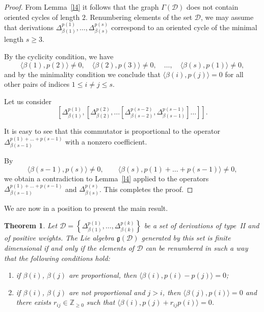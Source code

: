 \documentclass[a4paper, 12pt,oneside,reqno]{amsart}
\numberwithin{equation}{section}
\newtheorem{theorem}{Theorem}[section]
\theoremstyle{definition}
\begin{document}
\begin{proof}
From Lemma~\ref{l4} it follows that the graph $\Gamma(\mathcal{D})$ does not contain oriented cycles of length $2$. Renumbering elements of the set $\mathcal{D}$, we may assume that derivations $\Delta^{p(1)}_{\beta(1)},\ldots,\Delta^{p(s)}_{\beta(s)}$ correspond to an oriented cycle of the minimal length $s\ge 3$. 

By the cyclicity condition, we have
$$
\langle\beta(1),p(2)\rangle\ne 0, \quad \langle\beta(2),p(3)\rangle\ne 0, \quad \ldots, \quad \langle\beta(s),p(1)\rangle\ne 0, 
$$ 
and by the minimality condition we conclude that $\langle\beta(i),p(j)\rangle=0$ for all other pairs of indices $1\le i\ne j\le s$. 

Let us consider
\[
 \left[\Delta^{p(1)}_{\beta(1)},\left[\Delta^{p(2)}_{\beta(2 )},\ldots \left[\Delta^{p(s-2)}_{\beta(s-2)},\Delta^{p(s-1)}_{\beta(s-1)}\right]\ldots\right]\right].
\]

It is easy to see that this commutator is proportional to the operator $\Delta^{p(1)+\ldots+p(s-1)}_{\beta(s-1)}$ with a nonzero coefficient.

By
$$
\langle\beta(s-1),p(s)\rangle\ne 0, \qquad \langle \beta(s), p(1)+\ldots+p(s-1)\rangle\ne 0,
$$
we obtain a contradiction to Lemma~\ref{l4} applied to the operators $\Delta^{p(1)+\ldots+p(s-1)}_{\beta(s-1)}$ and $\Delta^{p(s)}_{\beta(s)}$. This completes the proof.
\end{proof}

We are now in a position to present the main result.

\begin{theorem}
\label{t2}
Let $\mathcal{D}=\left\{\Delta^{p(1)}_{\beta(1)},\ldots,\Delta^{p(k)}_{\beta(k)}\right\}$ be a set of derivations of type~II and of positive weights. The Lie algebra $\mathfrak{g}(\mathcal{D})$ generated by this set is finite dimensional if and only if the elements of $\mathcal{D}$ can be renumbered in such a way that the following conditions hold:
\begin{enumerate}
\item[1)]
if $\beta(i)$, $\beta(j)$ are proportional, then $\langle\beta(i),p(i)-p(j)\rangle=0$;
\item[2)] 
if $\beta(i)$, $\beta(j)$ are not proportional and $j>i$, then $\langle\beta(j),p(i)\rangle=0$ and there exists $r_{ij}\in\mathbb{Z}_{\ge 0}$ such that $\langle\beta(i),p(j)+r_{ij}p(i)\rangle=0$.
\end{enumerate}
\end{theorem} 
\end{document}
